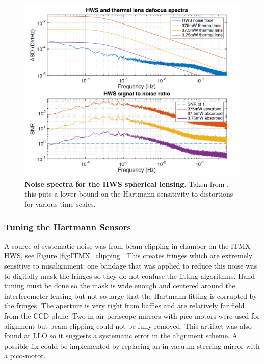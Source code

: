 	\begin{figure}[!]
	\centering
	\includegraphics[width=0.7\textheight]{../Figures/HWS_Noise.PNG}
	\caption[Noise spectra for the HWS spherical lensing.] 
	{\textbf{Noise spectra for the HWS spherical lensing.} Taken from \cite{AWC_current}, this puts a lower bound on the Hartmann sensitivity to distortions for various time scales.}
	\label{fig:HWS_spectra}
	\end{figure}
	
	\subsubsection{Tuning the Hartmann Sensors}
	A source of systematic noise was from beam clipping in chamber on the ITMX HWS, see Figure \ref{fig:ITMX_clipping}. This creates fringes which are extremely sensitive to misalignment; one bandage that was applied to reduce this noise was to digitally mask the fringes so they do not confuse the fitting algorithms.  Hand tuning must be done so the mask is wide enough and centered around the interferometer lensing but not so large that the Hartmann fitting is corrupted by the fringes.  The aperture is very tight from baffles and are relatively far field from the CCD plane.  Two in-air periscope mirrors with pico-motors were used for alignment but beam clipping could not be fully removed.  This artifact was also found at LLO so it suggests a systematic error in the alignment scheme.  A possible fix could be implemented by replacing an in-vacuum steering mirror with a pico-motor.
	
